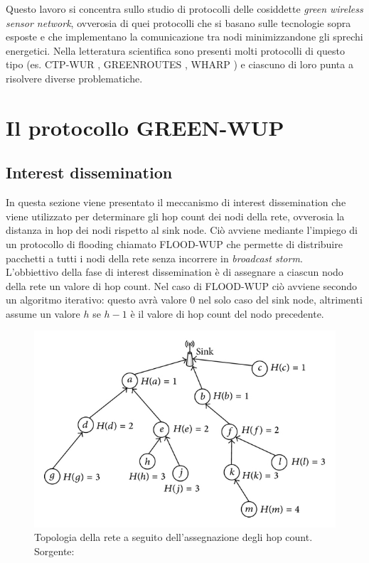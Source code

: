 \documentclass[binding=0.6cm,TFA]{sapthesis}
\begin{document}
Questo lavoro si concentra sullo studio di protocolli delle cosiddette \emph{green wireless sensor network}, ovverosia di quei protocolli che si basano
sulle tecnologie sopra esposte e che implementano la comunicazione tra nodi minimizzandone gli sprechi energetici. Nella letteratura scientifica
sono presenti molti protocolli di questo tipo (es. CTP-WUR \cite{ctp-wur-paper}, GREENROUTES \cite{wake-up-radios-paper}, WHARP \cite{wharp-paper}) e
ciascuno di loro punta a risolvere diverse problematiche.

\chapter{Il protocollo GREEN-WUP}

\section{Interest dissemination}

In questa sezione viene presentato il meccanismo di interest dissemination che viene utilizzato per determinare gli hop count dei nodi della rete,
ovverosia la distanza in hop dei nodi rispetto al sink node. Ciò avviene mediante l'impiego di un protocollo di flooding chiamato FLOOD-WUP
\cite{novel-wake-up-receiver-paper} che permette di distribuire pacchetti a tutti i nodi della rete senza incorrere in \emph{broadcast storm}.\\

L'obbiettivo della fase di interest dissemination è di assegnare a ciascun nodo della rete un valore di hop count. Nel caso di FLOOD-WUP ciò
avviene secondo un algoritmo iterativo: questo avrà valore 0 nel solo caso del sink node, altrimenti assume un valore $h$ se $h-1$ è il valore
di hop count del nodo precedente.

\begin{figure}[h]
    \begin{center}
        \includegraphics[scale=1.8]{hop-count-algorithm.png}
        \caption{Topologia della rete a seguito dell'assegnazione degli hop count. Sorgente: \cite{hop-count-figure}}
    \end{center}
\end{figure}
\end{document}
